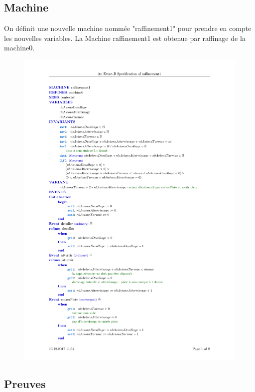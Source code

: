 \subsection{Machine}
 On définit une nouvelle machine nommée "raffinement1" pour prendre en compte les nouvelles variables. La Machine raffinement1 est obtenue par raffinage de la machine0.
 \begin{figure}[H]
 	\begin{center}	
 		\includegraphics[scale=0.8]{images/1/machine1}
 		\caption{}
 		\label{machine1}
 	\end{center}
 \end{figure}
 
 \subsection{Preuves}
 
